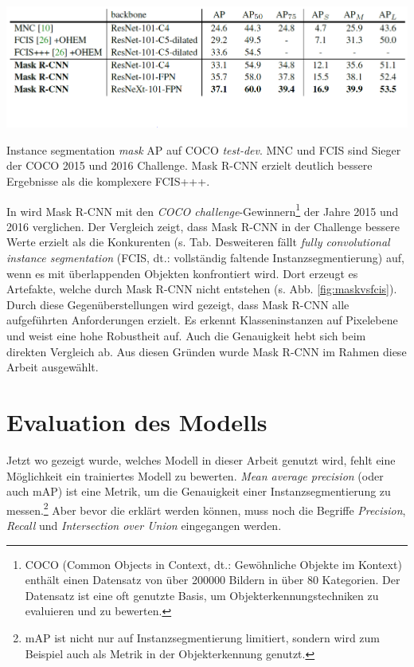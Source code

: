 \begin{table}[ht]
  \centering
  \includegraphics[width=\textwidth]{pics/mrcnn-vs-fcis-vs-mnc.PNG}
  \caption[Mask R-CNN im Vergleich]{Instance segmentation \textit{mask} AP auf COCO \textit{test-dev}. MNC und FCIS sind Sieger der COCO 2015 und 2016 Challenge. Mask R-CNN erzielt deutlich bessere Ergebnisse als die komplexere FCIS+++.\cite{ref:maskrcnn}}
  \label{tab:maskvsfcisvsmnc}
\end{table}
\noindent
In \cite{ref:maskrcnn} wird Mask R-CNN mit den \textit{COCO challenge}-Gewinnern\footnote{COCO (Common Objects in Context, dt.: Gewöhnliche Objekte im Kontext) enthält einen Datensatz von über 200000 Bildern in über 80 Kategorien. Der Datensatz ist eine oft genutzte Basis, um Objekterkennungstechniken zu evaluieren und zu bewerten.\cite{ref:coco}} der Jahre 2015 und 2016 verglichen. Der Vergleich zeigt, dass Mask R-CNN in der Challenge bessere Werte erzielt als die Konkurenten (s. Tab. \. Desweiteren fällt \textit{fully convolutional instance segmentation} (FCIS, dt.: vollständig faltende Instanzsegmentierung) auf, wenn es mit überlappenden Objekten konfrontiert wird. Dort erzeugt es Artefakte, welche durch Mask R-CNN nicht entstehen (s. Abb. \ref{fig:maskvsfcis}). Durch diese Gegenüberstellungen wird gezeigt, dass Mask R-CNN alle aufgeführten Anforderungen erzielt. Es erkennt Klasseninstanzen auf Pixelebene und weist eine hohe Robustheit auf. Auch die Genauigkeit hebt sich beim direkten Vergleich ab. Aus diesen Gründen wurde Mask R-CNN im Rahmen diese Arbeit ausgewählt.

\section{Evaluation des Modells}\label{sec:map}

Jetzt wo gezeigt wurde, welches Modell in dieser Arbeit genutzt wird, fehlt eine Möglichkeit ein trainiertes Modell zu bewerten. \textit{Mean average precision} (oder auch mAP) ist eine Metrik, um die Genauigkeit einer Instanzsegmentierung zu messen.\footnote{mAP ist nicht nur auf Instanzsegmentierung limitiert, sondern wird zum Beispiel auch als Metrik in der Objekterkennung genutzt.} Aber bevor die erklärt werden können, muss noch die Begriffe \textit{Precision}, \textit{Recall} und \textit{Intersection over Union} eingegangen werden. 


